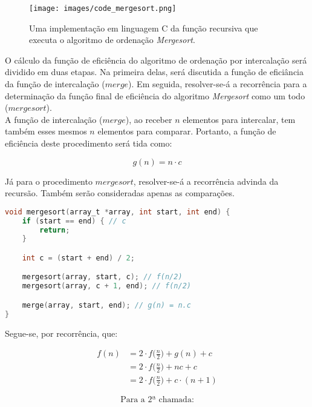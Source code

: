 \documentclass[fontsize=10pt]{article}
\begin{document}
\begin{figure}[H]
\centering
\texttt{[image: images/code\_mergesort.png]}
\caption{Uma implementação em linguagem C da função recursiva que executa o algoritmo de ordenação \textit{Mergesort}.}
\label{mergesort-code}
\end{figure}

O cálculo da função de eficiência do algoritmo de ordenação por intercalação será dividido em duas etapas. Na primeira delas, será discutida a função de eficiância da função de intercalação ($merge$). Em seguida, resolver-se-á a recorrência para a determinação da função final de eficiência do algoritmo \textit{Mergesort} como um todo ($mergesort$). \\

A função de intercalação ($merge$), ao receber $n$ elementos para intercalar, tem também esses mesmos $n$ elementos para comparar. Portanto, a função de eficiência deste procedimento será tida como:

\begin{equation} \label{eq7}
g(n) = n \cdot c
\end{equation}

Já para o procedimento $mergesort$, resolver-se-á a recorrência advinda da recursão. Também serão consideradas apenas as comparações.\\

\begin{lstlisting}[language=C]
void mergesort(array_t *array, int start, int end) {
    if (start == end) { // c
        return;
    }

    int c = (start + end) / 2;

    mergesort(array, start, c); // f(n/2)
    mergesort(array, c + 1, end); // f(n/2)

    merge(array, start, end); // g(n) = n.c
}
\end{lstlisting}

Segue-se, por recorrência, que:

\begin{equation} \label{eq8}
\begin{split}
f(n) & = 2 \cdot f \Big( \frac{n}{2} \Big) + g(n) + c \\
	 & = 2 \cdot f \Big( \frac{n}{2} \Big) + nc + c \\
	 & = 2 \cdot f \Big( \frac{n}{2} \Big) + c \cdot (n + 1) 
\end{split}
\end{equation}

$$ \text{Para a 2ª chamada:}$$
\end{document}
